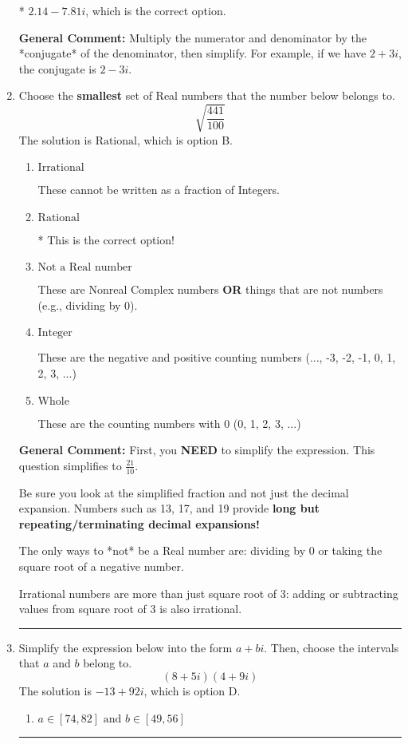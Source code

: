 \documentclass{extbook}[14pt]
\newcommand{\litem}[1]{\item #1

\rule{\textwidth}{0.4pt}}
\begin{document}
\begin{enumerate}
{\begin{enumerate}[label=\Alph*.]
* $2.14  - 7.81 i$, which is the correct option.
\end{enumerate}

\textbf{General Comment:} Multiply the numerator and denominator by the *conjugate* of the denominator, then simplify. For example, if we have $2+3i$, the conjugate is $2-3i$.
}
\litem{
Choose the \textbf{smallest} set of Real numbers that the number below belongs to.
\[ \sqrt{\frac{441}{100}} \]The solution is \( \text{Rational} \), which is option B.\begin{enumerate}[label=\Alph*.]
\item \( \text{Irrational} \)

These cannot be written as a fraction of Integers.
\item \( \text{Rational} \)

* This is the correct option!
\item \( \text{Not a Real number} \)

These are Nonreal Complex numbers \textbf{OR} things that are not numbers (e.g., dividing by 0).
\item \( \text{Integer} \)

These are the negative and positive counting numbers (..., -3, -2, -1, 0, 1, 2, 3, ...)
\item \( \text{Whole} \)

These are the counting numbers with 0 (0, 1, 2, 3, ...)
\end{enumerate}

\textbf{General Comment:} First, you \textbf{NEED} to simplify the expression. This question simplifies to $\frac{21}{10}$. 
 
 Be sure you look at the simplified fraction and not just the decimal expansion. Numbers such as 13, 17, and 19 provide \textbf{long but repeating/terminating decimal expansions!} 
 
 The only ways to *not* be a Real number are: dividing by 0 or taking the square root of a negative number. 
 
 Irrational numbers are more than just square root of 3: adding or subtracting values from square root of 3 is also irrational.
}
\litem{
Simplify the expression below into the form $a+bi$. Then, choose the intervals that $a$ and $b$ belong to.
\[ (8 + 5 i)(4 + 9 i) \]The solution is \( -13 + 92 i \), which is option D.\begin{enumerate}[label=\Alph*.]
\item \( a \in [74, 82] \text{ and } b \in [49, 56] \)


\end{enumerate}}
\end{enumerate}
\end{document}

